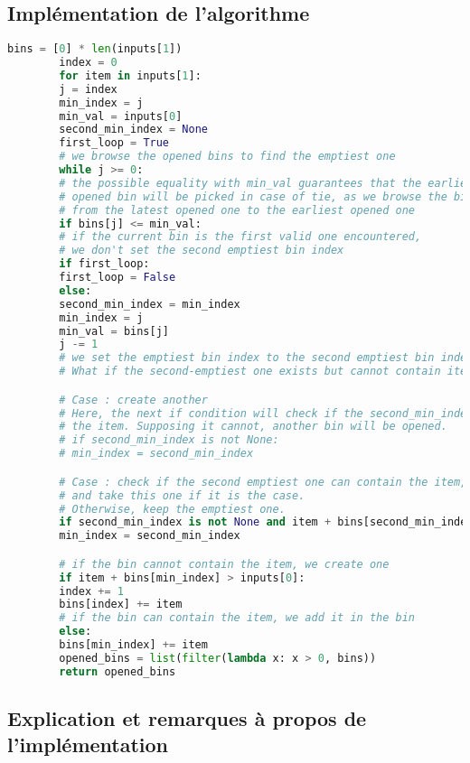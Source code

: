 \documentclass{article}
\begin{document}
    \subsection{Implémentation de l'algorithme}
    \begin{lstlisting}[language=Python, frame=single]
        bins = [0] * len(inputs[1])
        index = 0
        for item in inputs[1]:
        j = index
        min_index = j
        min_val = inputs[0]
        second_min_index = None
        first_loop = True
        # we browse the opened bins to find the emptiest one
        while j >= 0:
        # the possible equality with min_val guarantees that the earliest
        # opened bin will be picked in case of tie, as we browse the bins
        # from the latest opened one to the earliest opened one
        if bins[j] <= min_val:
        # if the current bin is the first valid one encountered,
        # we don't set the second emptiest bin index
        if first_loop:
        first_loop = False
        else:
        second_min_index = min_index
        min_index = j
        min_val = bins[j]
        j -= 1
        # we set the emptiest bin index to the second emptiest bin index if it exists
        # What if the second-emptiest one exists but cannot contain item ?

        # Case : create another
        # Here, the next if condition will check if the second_min_index can contain
        # the item. Supposing it cannot, another bin will be opened.
        # if second_min_index is not None:
        # min_index = second_min_index

        # Case : check if the second emptiest one can contain the item,
        # and take this one if it is the case.
        # Otherwise, keep the emptiest one.
        if second_min_index is not None and item + bins[second_min_index] < inputs[0]:
        min_index = second_min_index

        # if the bin cannot contain the item, we create one
        if item + bins[min_index] > inputs[0]:
        index += 1
        bins[index] += item
        # if the bin can contain the item, we add it in the bin
        else:
        bins[min_index] += item
        opened_bins = list(filter(lambda x: x > 0, bins))
        return opened_bins
    \end{lstlisting}

    \subsection{Explication et remarques à propos de l'implémentation}
\end{document}
